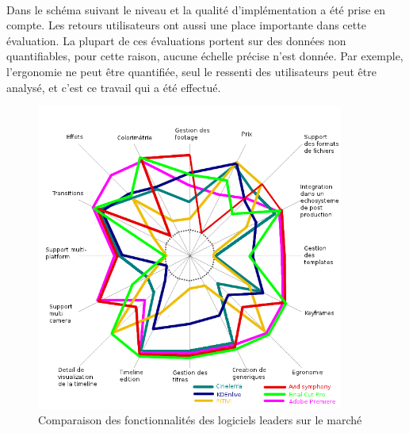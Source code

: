 \paragraph{}

Dans le schéma suivant le niveau et la qualité
d'implémentation a été prise en compte. Les retours utilisateurs
ont aussi une place importante dans cette évaluation. La plupart de
ces évaluations portent sur des données non quantifiables, pour cette
raison, aucune échelle précise n'est donnée.  Par exemple, l'ergonomie
ne peut être quantifiée, seul le ressenti des utilisateurs peut être
analysé, et c'est ce travail qui a été effectué.

\begin{figure} [H]

  \begin{center}

    \includegraphics[width=0.9\textwidth]{images/spiderDiagramFeaturesComparision}

  \end{center}

  \caption{Comparaison des fonctionnalités des logiciels leaders sur
  le marché}

  \label{Yes}

\end{figure}

\paragraph {}

